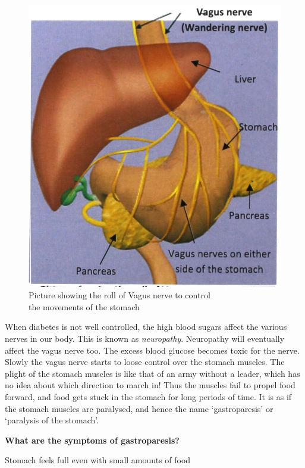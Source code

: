 \begin{figure}
\includegraphics{images/076.jpg}
\caption{Picture showing the roll of Vagus nerve to control\\ the movements of the stomach}
\end{figure}

When diabetes is not well controlled, the high blood sugars affect the various nerves in our body. This is known as \textit{neuropathy}. Neuropathy will eventually affect the vagus nerve too. The excess blood glucose becomes toxic for the nerve. Slowly the vagus nerve starts to loose control over the stomach muscles. The plight of the stomach muscles is like that of an army without a leader, which has no idea about which direction to march in! Thus the muscles fail to propel food forward, and food gets stuck in the stomach for long periods of time. It is as if the stomach muscles are paralysed, and hence the name ‘gastroparesis’ or ‘paralysis of the stomach’.

\textbf{What are the symptoms of gastroparesis?}

\item Stomach feels full even with small amounts of food

